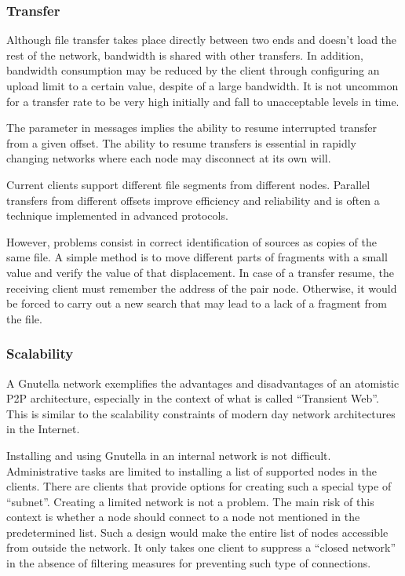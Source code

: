 \subsubsection{Transfer}

Although file transfer takes place directly between two ends and doesn't
load the rest of the network, bandwidth is shared with other transfers. In
addition, bandwidth consumption may be reduced by the client through  configuring
an upload limit to a certain value, despite of a large bandwidth. It is not
uncommon for a transfer rate to be very high initially and fall to
unacceptable levels in time.

The parameter in messages implies the ability to resume interrupted transfer
from a given offset. The ability to resume transfers is essential in rapidly
changing networks where each node may disconnect at its own will.

Current clients support different file segments from different nodes.
Parallel transfers from different offsets improve efficiency and reliability
and is often a technique implemented in advanced protocols.

However, problems consist in correct identification of sources as copies
of the same file. A simple method is to move different parts of fragments with
a small value and verify the value of that displacement. In case of a transfer
resume, the receiving client must remember the address of the pair node.
Otherwise, it would be forced to carry out a new search that may lead to
a lack of a fragment from the file.

\subsubsection{Scalability}

A Gnutella network exemplifies the advantages and disadvantages of an atomistic
P2P architecture, especially in the context of what is called ``Transient Web''.
This is similar to the scalability constraints of modern day network
architectures in the Internet.

Installing and using Gnutella in an internal network is not difficult.
Administrative tasks are limited to installing a list of supported nodes in
the clients. There are clients that provide options for creating such a
special type of ``subnet''. Creating a limited network is not a problem. The
main risk of this context is whether a node should connect to a node not
mentioned in the predetermined list. Such a design would make the entire list
of nodes accessible from outside the network. It only takes one client to
suppress a ``closed network'' in the absence of filtering measures for
preventing such type of connections.

